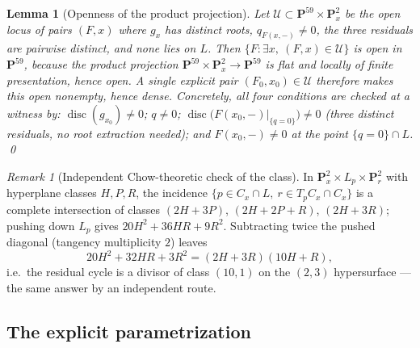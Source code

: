 \documentclass[11pt]{amsart}
\newtheorem{lemma}[theorem]{Lemma}
\theoremstyle{definition}
\theoremstyle{remark}
\newtheorem{remark}[theorem]{Remark}
\newcommand{\PP}{\mathbf{P}}
\begin{document}
\begin{lemma}[Openness of the product projection]\label{lem:openness}
Let $\mathcal U\subset\PP^{59}\times\PP^2_x$ be the open locus of pairs
$(F,x)$ where $g_x$ has distinct roots, $q_{F(x,-)}\ne0$, the three
residuals are pairwise distinct, and none lies on $L$.  Then
$\{F:\exists x,\ (F,x)\in\mathcal U\}$ is open in $\PP^{59}$, because the
product projection $\PP^{59}\times\PP^2_x\to\PP^{59}$ is flat and locally
of finite presentation, hence open.  A single explicit pair
$(F_0,x_0)\in\mathcal U$ therefore makes this open nonempty, hence dense.
Concretely, all four
conditions are checked at a witness by: $\operatorname{disc}(g_{x_0})\ne0$;
$q\neq0$; $\operatorname{disc}\bigl(F(x_0,-)|_{\{q=0\}}\bigr)\ne0$ (three
distinct residuals, no root extraction needed); and
$F(x_0,-)\ne0$ at the point $\{q=0\}\cap L$.
\qed
\end{lemma}

\begin{remark}[Independent Chow-theoretic check of the class]
In $\PP^2_x\times L_p\times\PP^2_r$ with hyperplane classes $H,P,R$, the
incidence $\{p\in C_x\cap L,\ r\in T_pC_x\cap C_x\}$ is a complete
intersection of classes $(2H{+}3P)$, $(2H{+}2P{+}R)$, $(2H{+}3R)$; pushing
down $L_p$ gives $20H^2+36HR+9R^2$.  Subtracting twice the pushed diagonal
(tangency multiplicity $2$) leaves
\[
20H^2+32HR+3R^2=(2H+3R)(10H+R),
\]
i.e.\ the residual cycle is a divisor of class $(10,1)$ on the
$(2,3)$ hypersurface --- the same answer by an independent route.
\end{remark}

\subsection{The explicit parametrization}\label{sec:explicit}
\end{document}
